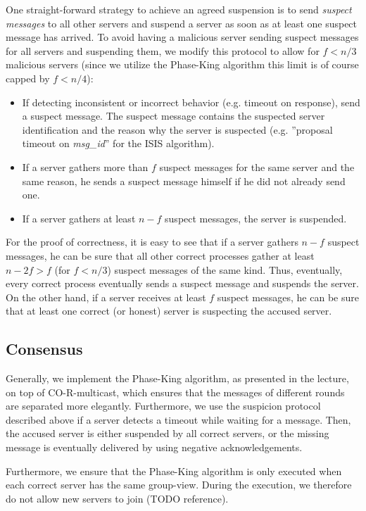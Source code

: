 \documentclass[runningheads]{llncs}
\begin{document}
One straight-forward strategy to achieve an agreed suspension is to send \textit{suspect messages} to all other servers and suspend a server as soon as at least one suspect message has arrived. To avoid having a malicious server sending suspect messages for all servers and suspending them, we modify this protocol to allow for $f < n/3$ malicious servers (since we utilize the Phase-King algorithm this limit is of course capped by $f < n/4$):
\begin{itemize}
    \item If detecting inconsistent or incorrect behavior (e.g. timeout on response), send a suspect message. The suspect message contains the suspected server identification and the reason why the server is suspected (e.g. ''proposal timeout on \textit{msg\_id}'' for the ISIS algorithm).
    \item If a server gathers more than $f$ suspect messages for the same server and the same reason, he sends a suspect message himself if he did not already send one.
    \item If a server gathers at least $n-f$ suspect messages, the server is suspended.
\end{itemize}
For the proof of correctness, it is easy to see that if a server gathers $n-f$ suspect messages, he can be sure that all other correct processes gather at least $n-2f > f$ (for $f < n/3$) suspect messages of the same kind. Thus, eventually, every correct process eventually sends a suspect message and suspends the server. On the other hand, if a server receives at least $f$ suspect messages, he can be sure that at least one correct (or honest) server is suspecting the accused server.

\subsection{Consensus}
Generally, we implement the Phase-King algorithm, as presented in the lecture, on top of CO-R-multicast, which ensures that the messages of different rounds are separated more elegantly. Furthermore, we use the suspicion protocol described above if a server detects a timeout while waiting for a message. Then, the accused server is either suspended by all correct servers, or the missing message is eventually delivered by using negative acknowledgements.

Furthermore, we ensure that the Phase-King algorithm is only executed when each correct server has the same group-view. During the execution, we therefore do not allow new servers to join (TODO reference). 
\end{document}
